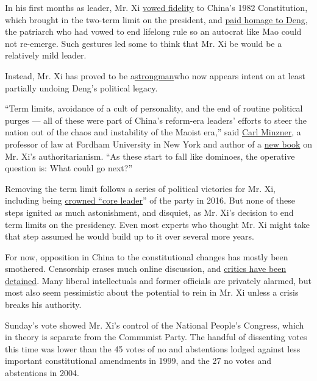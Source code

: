 In his first months as leader, Mr. Xi
\href{http://usa.chinadaily.com.cn/china/2012-12/05/content_15985894.htm}{vowed
fidelity} to China's 1982 Constitution, which brought in the two-term
limit on the president, and
\href{http://www.nytimes.com/2012/12/10/world/asia/chinese-leaders-visit-to-shenzhen-hints-at-reform.html}{paid
homage to Deng}, the patriarch who had vowed to end lifelong rule so an
autocrat like Mao could not re-emerge. Such gestures led some to think
that Mr. Xi be would be a relatively mild leader.

Instead, Mr. Xi has proved to be
a\href{https://www.nytimes.com/2018/02/26/world/asia/china-xi-jinping-authoritarianism.html}{strongman}who
now appears intent on at least partially undoing Deng's political
legacy.

``Term limits, avoidance of a cult of personality, and the end of
routine political purges --- all of these were part of China's
reform-era leaders' efforts to steer the nation out of the chaos and
instability of the Maoist era,'' said
\href{https://www.fordham.edu/info/23165/carl_minzner}{Carl Minzner}, a
professor of law at Fordham University in New York and author of a
\href{https://global.oup.com/academic/product/end-of-an-era-9780190672089?cc=us\&lang=en\&}{new
book} on Mr. Xi's authoritarianism. ``As these start to fall like
dominoes, the operative question is: What could go next?''

Removing the term limit follows a series of political victories for Mr.
Xi, including being
\href{https://www.nytimes.com/2016/10/28/world/asia/xi-jinping-china.html?_r=0}{crowned
``core leader}'' of the party in 2016. But none of these steps ignited
as much astonishment, and disquiet, as Mr. Xi's decision to end term
limits on the presidency. Even most experts who thought Mr. Xi might
take that step assumed he would build up to it over several more years.

For now, opposition in China to the constitutional changes has mostly
been smothered. Censorship erases much online discussion, and
\href{https://www.nytimes.com/2018/03/08/world/asia/china-xi-jinping-term-limits-dissent.html}{critics
have been detained}. Many liberal intellectuals and former officials are
privately alarmed, but most also seem pessimistic about the potential to
rein in Mr. Xi unless a crisis breaks his authority.

Sunday's vote showed Mr. Xi's control of the National People's Congress,
which in theory is separate from the Communist Party. The handful of
dissenting votes this time was lower than the 45 votes of no and
abstentions lodged against less important constitutional amendments in
1999, and the 27 no votes and abstentions in 2004.


